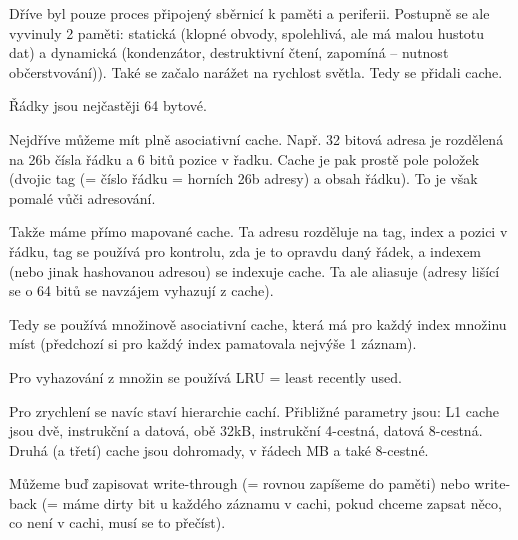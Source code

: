 \documentclass[12pt]{article}                   %
\begin{document}

        \begin{poznamka}
            Dříve byl pouze proces připojený sběrnicí k paměti a periferii. Postupně se ale vyvinuly 2 paměti: statická (klopné obvody, spolehlivá, ale má malou hustotu dat) a dynamická (kondenzátor, destruktivní čtení, zapomíná -- nutnost občerstvování)). Také se začalo narážet na rychlost světla. Tedy se přidali cache.
        \end{poznamka}

        \begin{definice}[Cache]
            Řádky jsou nejčastěji 64 bytové.

            Nejdříve můžeme mít plně asociativní cache. Např. 32 bitová adresa je rozdělená na 26b čísla řádku a 6 bitů pozice v řadku. Cache je pak prostě pole položek (dvojic tag (= číslo řádku = horních 26b adresy) a obsah řádku). To je však pomalé vůči adresování.

            Takže máme přímo mapované cache. Ta adresu rozděluje na tag, index a pozici v řádku, tag se používá pro kontrolu, zda je to opravdu daný řádek, a indexem (nebo jinak hashovanou adresou) se indexuje cache. Ta ale aliasuje (adresy lišící se o 64 bitů se navzájem vyhazují z cache).

            Tedy se používá množinově asociativní cache, která má pro každý index množinu míst (předchozí si pro každý index pamatovala nejvýše 1 záznam).

            Pro vyhazování z množin se používá LRU = least recently used.

            Pro zrychlení se navíc staví hierarchie cachí. Přibližné parametry jsou: L1 cache jsou dvě, instrukční a datová, obě 32kB, instrukční 4-cestná, datová 8-cestná. Druhá (a třetí) cache jsou dohromady, v řádech MB a také 8-cestné.
        \end{definice}

        \begin{definice}[Zápis]
            Můžeme buď zapisovat write-through (= rovnou zapíšeme do paměti) nebo write-back (= máme dirty bit u každého záznamu v cachi, pokud chceme zapsat něco, co není v cachi, musí se to přečíst).
        \end{definice}
\end{document}
